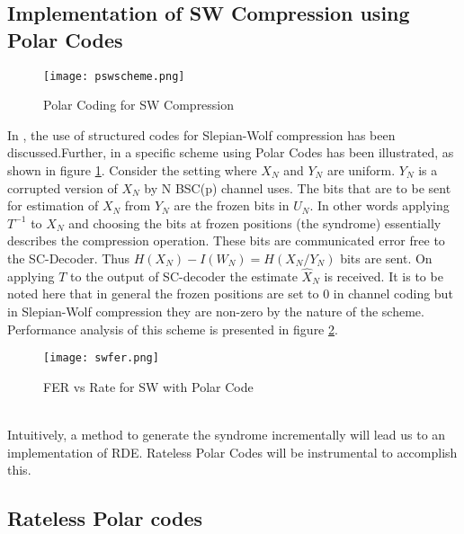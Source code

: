 \documentclass[
11pt, %
a4paper, %
oneside, %
headinclude,footinclude, %
BCOR5mm, %
]{scrartcl}
\begin{document}
\subsection{Implementation of SW Compression using Polar Codes}\label{psw}
\begin{figure}[h]
 \begin{center}
    \texttt{[image: pswscheme.png]}
  \end{center}
  \caption{Polar Coding for SW Compression}
  \label{fig:pswscheme}
\end{figure}
In \cite{discus}, the use of structured codes for Slepian-Wolf compression has been discussed.Further, in \cite{pslep} a specific scheme using Polar Codes has been illustrated, as shown in figure \ref{fig:pswscheme}.
Consider the setting where $X_N$ and $Y_N$ are uniform. $Y_N$ is a corrupted version of $X_N$ by N BSC(p) channel uses. The bits that are to be sent for estimation of $X_N$ from $Y_N$ are the frozen bits in $U_N$. In other words applying $T^{-1}$ to $X_N$ and choosing the bits at frozen positions (the syndrome) essentially describes the compression operation. These bits are communicated error free to the SC-Decoder. Thus $H(X_N)-I(W_N)=H(X_N/Y_N)$ bits are sent. On applying $T$ to the output of SC-decoder the estimate $\hat{X}_N$ is received. It is to be noted here that in general the frozen positions are set to $0$ in channel coding but in Slepian-Wolf compression they are non-zero by the nature of the scheme. Performance analysis of this scheme is presented in figure \ref{fig:swfer}.
\begin{figure}[h]
 \begin{center}
    \texttt{[image: swfer.png]}
  \end{center}
  \caption{FER vs Rate for SW with Polar Code}
  \label{fig:swfer}
\end{figure}\\
Intuitively, a method to generate the syndrome incrementally will lead us to an implementation of RDE. Rateless Polar Codes will be instrumental to accomplish this.

\subsection{Rateless Polar codes}
\end{document}
